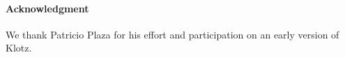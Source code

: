 \documentclass{sig-alternate}
\begin{document}
\paragraph{Acknowledgment} 
We thank Patricio Plaza for his effort and participation on an early version of Klotz.

%



\end{document}
